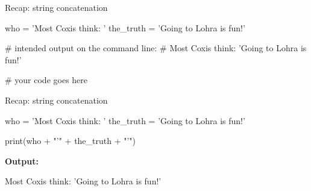 \documentclass[
  american,
  ignorenonframetext,
]{beamer}
\newenvironment{pyexec}[1]{\noindent \textbf{Output: }  #1}{}
\begin{document}
\begin{frame}{Recap: string concatenation}
\protect\hypertarget{recap-string-concatenation}{}

\begin{pythoncode}

who = 'Most Coxis think: '
the_truth = 'Going to Lohra is fun!'

# intended output on the command line:
# Most Coxis think: 'Going to Lohra is fun!'

# your code goes here

\end{pythoncode}


\end{frame}

\begin{frame}{Recap: string concatenation}
\protect\hypertarget{recap-string-concatenation-1}{}

\begin{pythoncode}

who = 'Most Coxis think: '
the_truth = 'Going to Lohra is fun!'

print(who + "'" + the_truth + "'")

\end{pythoncode}

\begin{pyexec}

\begin{outputcode}

Most Coxis think: 'Going to Lohra is fun!'

\end{outputcode}

\end{pyexec}


\end{frame}
\end{document}
